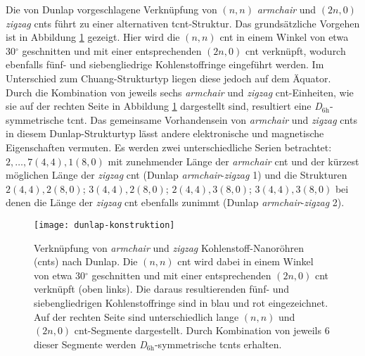 Die von Dunlap vorgeschlagene Verknüpfung von $(n,n)$ \textit{armchair} und $(2n,0)$ \textit{zigzag} \acp{cnt} führt zu einer alternativen \ac{tcnt}-Struktur. Das grundsätzliche Vorgehen ist in Abbildung \ref{abb:dunlap-konstruktion} gezeigt. Hier wird die $(n,n)$ \ac{cnt} in einem Winkel von etwa 30$^\circ$ geschnitten und mit einer entsprechenden $(2n,0)$ \ac{cnt} verknüpft, wodurch ebenfalls fünf- und siebengliedrige Kohlenstoffringe eingeführt werden. Im Unterschied zum \glqq Chuang-Strukturtyp\grqq{} liegen diese jedoch auf dem Äquator. Durch die Kombination von jeweils sechs \textit{armchair} und \textit{zigzag} \ac{cnt}-Einheiten, wie sie auf der rechten Seite in Abbildung \ref{abb:dunlap-konstruktion} dargestellt sind, resultiert eine \textit{D}$_{6\text{h}}$-symmetrische \ac{tcnt}. Das gemeinsame Vorhandensein von \textit{armchair} und \textit{zigzag} \acp{cnt} in diesem \glqq Dunlap-Strukturtyp\grqq{} lässt andere elektronische und magnetische Eigenschaften vermuten. Es werden zwei unterschiedliche Serien betrachtet: $2,\dots,7(4,4),1(8,0)$ mit zunehmender Länge der \textit{armchair} \ac{cnt} und der kürzest möglichen Länge der \textit{zigzag} \ac{cnt} (\glqq Dunlap \textit{armchair}-\textit{zigzag} 1\grqq{}) und die Strukturen $2(4,4),2(8,0)$; $3(4,4),2(8,0)$; $2(4,4),3(8,0)$; $3(4,4),3(8,0)$ bei denen die Länge der \textit{zigzag} \ac{cnt} ebenfalls zunimmt (\glqq Dunlap \textit{armchair}-\textit{zigzag} 2\grqq{}).
\begin{figure}[ht!]
	\centering
	\texttt{[image: dunlap-konstruktion]}
	\captionsetup{figurewithin = chapter}
	\captionsetup{font=small, labelfont=bf}\caption[Verknüpfung von $(n,n)$ \textit{armchair} (orange) und $(2n,0)$ \textit{zigzag} (grün) \acp{cnt}]{Verknüpfung von \textit{armchair} und \textit{zigzag} Kohlenstoff-Nanoröhren (\acp{cnt}) nach Dunlap\supercite{dunlap1992connecting}. Die $(n,n)$ \ac{cnt} wird dabei in einem Winkel von etwa 30$^\circ$ geschnitten und mit einer entsprechenden $(2n,0)$ \ac{cnt} verknüpft (oben links). Die daraus resultierenden fünf- und siebengliedrigen Kohlenstoffringe sind in blau und rot eingezeichnet. Auf der rechten Seite sind unterschiedlich lange $(n,n)$ und $(2n,0)$ \ac{cnt}-Segmente dargestellt. Durch Kombination von jeweils 6 dieser Segmente werden \textit{D}$_{6\text{h}}$-symmetrische \acp{tcnt} erhalten.}
\label{abb:dunlap-konstruktion}
\end{figure}
\FloatBarrier

